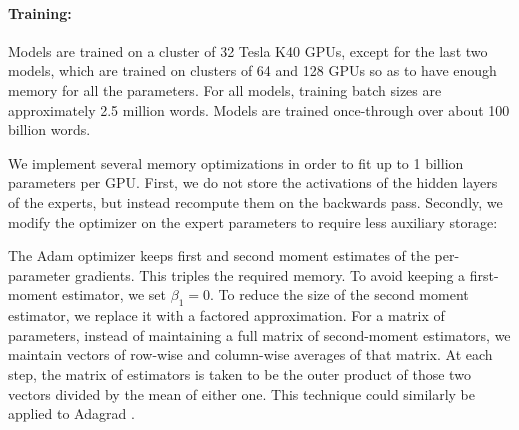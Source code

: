 \documentclass{article} %
\begin{document}
\paragraph{Training:}  Models are trained on a cluster of 32 Tesla K40 GPUs, except for the last two models, which are trained on clusters of 64 and 128 GPUs so as to have enough memory for all the parameters.   For all models, training batch sizes are approximately 2.5 million words.  Models are trained once-through over about 100 billion words.

We implement several memory optimizations in order to fit up to 1 billion parameters per GPU.   First, we do not store the activations of the hidden layers of the experts, but instead recompute them on the backwards pass.  Secondly, we modify the optimizer on the expert parameters to require less auxiliary storage:

The Adam optimizer \citep{kingma2014adam} keeps first and second moment estimates of the per-parameter gradients.  This triples the required memory.  To avoid keeping a first-moment estimator, we set $\beta_1=0$.  To reduce the size of the second moment estimator, we replace it with a factored approximation.  For a matrix of parameters, instead of maintaining a full matrix of second-moment estimators, we maintain vectors of row-wise and column-wise averages of that matrix.   At each step, the matrix of estimators is taken to be the outer product of those two vectors divided by the mean of either one.   This technique could similarly be applied to Adagrad \citep{duchi10}.
\end{document}
